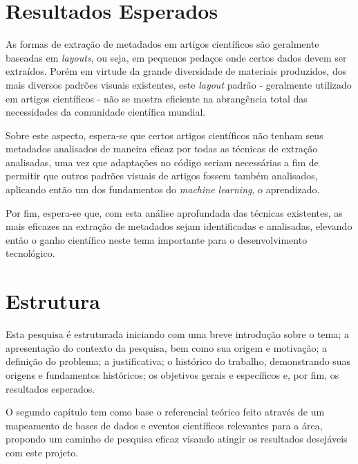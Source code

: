 \section{Resultados Esperados}
\label{sec:expected-results}


As formas de extração de metadados em artigos científicos são geralmente baseadas em \textit{layouts}, ou seja, em pequenos pedaços onde certos dados devem ser extraídos. Porém em virtude da grande diversidade de materiais produzidos, dos mais diversos padrões visuais existentes, este \textit{layout} padrão - geralmente utilizado em artigos científicos - não se mostra eficiente na abrangência total das necessidades da comunidade científica mundial. 

Sobre este aspecto, espera-se que certos artigos científicos não tenham seus metadados analisados de maneira eficaz por todas as técnicas de extração analisadas, uma vez que adaptações no código seriam necessárias a fim de permitir que outros padrões visuais de artigos fossem também analisados, aplicando então um dos fundamentos do \textit{machine learning}, o aprendizado. 

\begin{textedited}
Por fim, espera-se que, com esta análise aprofundada das técnicas existentes, as mais eficazes na extração de metadados sejam identificadas e analisadas, elevando então o ganho científico neste tema importante para o desenvolvimento tecnológico.
\end{textedited}


\section{Estrutura}
\label{sec:structure}

Esta pesquisa é estruturada iniciando com uma breve introdução sobre o tema; a apresentação do contexto da pesquisa, bem como sua origem e motivação; a definição do problema; a justificativa; o histórico do trabalho, demonstrando suas origens e fundamentos históricos; os objetivos gerais e específicos e, por fim, os resultados esperados.

\begin{textedited}
O segundo capítulo tem como base o referencial teórico feito através de um mapeamento de bases de dados e eventos científicos relevantes para a área, propondo um caminho de pesquisa eficaz visando atingir os resultados desejáveis com este projeto.
\end{textedited}

